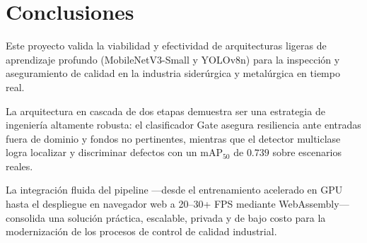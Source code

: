 \documentclass[11pt,a4paper]{article}
\begin{document}
\section{Conclusiones}

Este proyecto valida la viabilidad y efectividad de arquitecturas ligeras de aprendizaje
profundo (MobileNetV3-Small y YOLOv8n) para la inspección y aseguramiento de calidad en
la industria siderúrgica y metalúrgica en tiempo real. 

La arquitectura en cascada de dos etapas demuestra ser una estrategia de ingeniería
altamente robusta: el clasificador Gate asegura resiliencia ante entradas fuera de
dominio y fondos no pertinentes, mientras que el detector multiclase logra localizar y
discriminar defectos con un $\text{mAP}_{50}$ de $0.739$ sobre escenarios reales. 

La integración fluida del pipeline ---desde el entrenamiento acelerado en GPU hasta el
despliegue en navegador web a 20--30+ FPS mediante WebAssembly--- consolida una solución
práctica, escalable, privada y de bajo costo para la modernización de los procesos de
control de calidad industrial.
\end{document}
